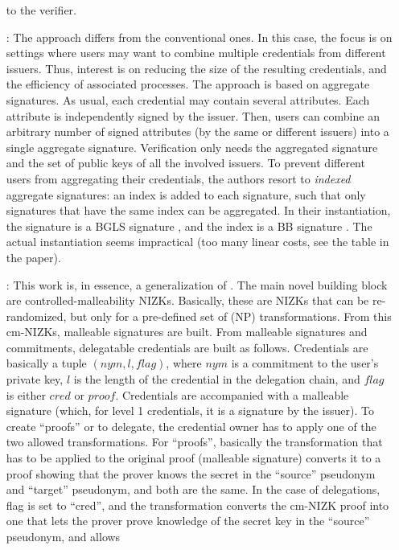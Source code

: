 \begin{enumerate}
  to the verifier.
\item[\cite{cl11}:] The approach differs from the conventional ones. In this
  case, the focus is on settings where users may want to combine multiple
  credentials from different issuers. Thus, interest is on reducing the size
  of the resulting credentials, and the efficiency of associated processes.
  The approach is based on aggregate signatures. As usual, each credential
  may contain several attributes. Each attribute is independently signed
  by the issuer. Then, users can combine an arbitrary number of signed
  attributes (by the same or different issuers) into a single aggregate
  signature. Verification only needs the aggregated signature and the set
  of public keys of all the involved issuers. To prevent different users
  from aggregating their credentials, the authors resort to \emph{indexed}
  aggregate signatures: an index is added to each signature, such that only
  signatures that have the same index can be aggregated. In their instantiation,
  the signature is a BGLS signature \cite{bgls03}, and the index is a BB
  signature \cite{bb04}. The actual instantiation seems impractical (too many
  linear costs, see the table in the paper).
\item[\cite{cklm14}:] This work is, in essence, a generalization of \cite{bcc+09}.
  The main novel building block are controlled-malleability NIZKs. Basically,
  these are NIZKs that can be re-randomized, but only for a pre-defined set of
  (NP) transformations. From this cm-NIZKs, malleable signatures are built.
  From malleable signatures and commitments, delegatable credentials are built
  as follows. Credentials are basically a tuple $(nym, l, flag)$, where $nym$
  is a commitment to the user's private key, $l$ is the length of the credential
  in the delegation chain, and $flag$ is either $cred$ or $proof$. Credentials
  are accompanied with a malleable signature (which, for level 1 credentials,
  it is a signature by the issuer). To create ``proofs'' or to delegate, the
  credential owner has to apply one of the two allowed transformations. For
  ``proofs'', basically the transformation that has to be applied to the original
  proof (malleable signature) converts it to a proof showing that the prover
  knows the secret in the ``source'' pseudonym and ``target'' pseudonym, and
  both are the same. In the case of delegations, flag is set to ``cred'', and
  the transformation converts the cm-NIZK proof into one that lets the prover
  prove knowledge of the secret key in the ``source'' pseudonym, and allows

\end{enumerate}
